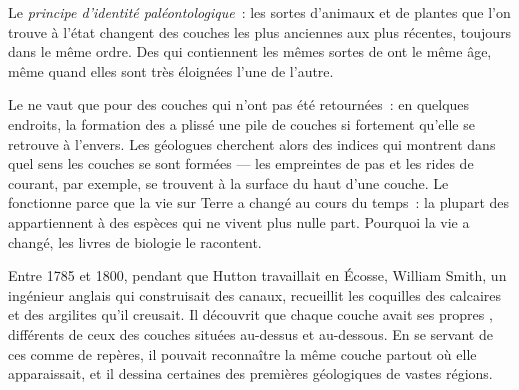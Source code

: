 \begin{definition}\label{def:g7:geological-time:fossil-succession}
Le \emph{principe d'identité paléontologique}~: les sortes
d'animaux et de plantes que l'on trouve à l'état  changent des
couches les plus anciennes aux plus récentes, toujours dans le même
ordre. Des  qui contiennent les mêmes sortes de  ont le même
âge, même quand elles sont très éloignées l'une de l'autre.
\end{definition}


Le  ne vaut que pour des couches qui n'ont pas
été retournées~: en quelques endroits, la formation des  a plissé
une pile de couches si fortement qu'elle se retrouve à l'envers. Les
géologues cherchent alors des indices qui montrent dans quel sens les
couches se sont formées --- les empreintes de pas et les rides de
courant, par exemple, se trouvent à la surface du haut d'une couche. Le
 fonctionne parce que la vie sur Terre
a changé au cours du temps~: la plupart des  appartiennent à des
espèces qui ne vivent plus nulle part. Pourquoi la vie a changé, les
livres de biologie le racontent.

\begin{history}
Entre 1785 et 1800, pendant que Hutton travaillait en Écosse, William
Smith, un ingénieur anglais qui construisait des canaux, recueillit les
coquilles  des calcaires et des argilites qu'il creusait. Il
découvrit que chaque couche avait ses propres , différents de ceux
des couches situées au-dessus et au-dessous. En se servant de ces
 comme de repères, il pouvait reconnaître la même couche partout
où elle apparaissait, et il dessina certaines des premières 
géologiques de vastes régions.
\end{history}

